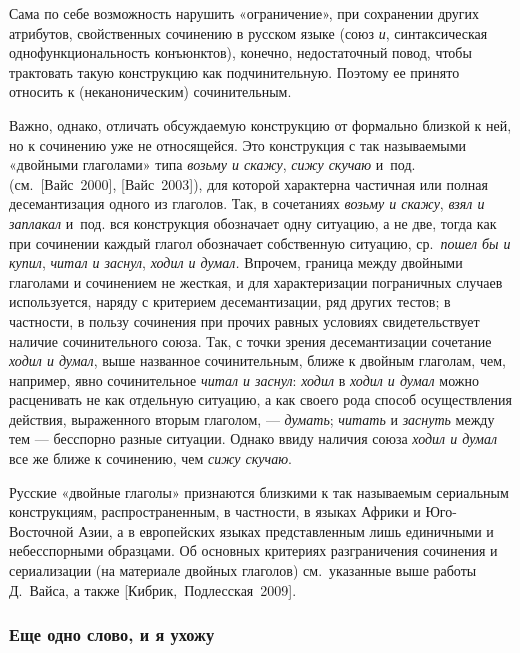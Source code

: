 Сама по себе возможность нарушить «ограничение», при сохранении других
атрибутов, свойственных сочинению в русском языке (союз \textit{и},
синтаксическая однофункциональность конъюнктов), конечно, недостаточный
повод, чтобы трактовать такую конструкцию как подчинительную. Поэтому ее
принято относить к (неканоническим) сочинительным.

Важно, однако, отличать обсуждаемую конструкцию от формально близкой к
ней, но к сочинению уже не относящейся. Это конструкция с так
называемыми «двойными глаголами» типа \textit{возьму и скажу}, \textit{сижу
скучаю} и~под. (см.~{[}Вайс~2000{]}, {[}Вайс~2003{]}), для которой
характерна частичная или полная десемантизация одного из глаголов. Так,
в сочетаниях \textit{возьму и скажу}, \textit{взял и заплакал} и~под. вся
конструкция обозначает одну ситуацию, а не две, тогда как при сочинении
каждый глагол обозначает собственную ситуацию, ср.~\textit{пошел бы и
купил}, \textit{читал и заснул}, \textit{ходил и думал.} Впрочем, граница
между двойными глаголами и сочинением не жесткая, и для характеризации
пограничных случаев используется, наряду с критерием десемантизации, ряд
других тестов; в частности, в пользу сочинения при прочих равных
условиях свидетельствует наличие сочинительного союза. Так, с точки
зрения десемантизации сочетание \textit{ходил и думал}, выше названное
сочинительным, ближе к двойным глаголам, чем, например, явно
сочинительное \textit{читал и заснул}: \textit{ходил} в \textit{ходил и думал}
можно расценивать не как отдельную ситуацию, а как своего рода способ
осуществления действия, выраженного вторым глаголом, --- \textit{думать};
\textit{читать} и \textit{заснуть} между тем --- бесспорно разные ситуации.
Однако ввиду наличия союза \textit{ходил и думал} все же ближе к
сочинению, чем \textit{сижу скучаю}.

Русские «двойные глаголы» признаются близкими к так называемым
сериальным конструкциям, распространенным, в частности, в языках Африки
и Юго-Восточной Азии, а в европейских языках представленным лишь
единичными и небесспорными образцами. Об основных критериях
разграничения сочинения и сериализации (на материале двойных глаголов)
см.~указанные выше работы Д.~Вайса, а также
{[}Кибрик,~Подлесская~2009{]}.

\subsubsection{Еще одно слово, и я
ухожу}\label{ux435ux449ux435-ux43eux434ux43dux43e-ux441ux43bux43eux432ux43e-ux438-ux44f-ux443ux445ux43eux436ux443}

